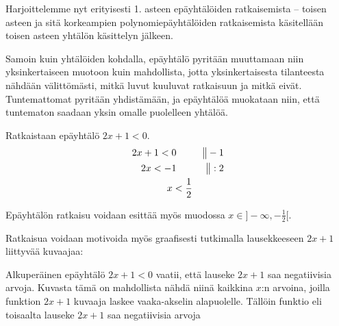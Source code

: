 Harjoittelemme nyt erityisesti 1. asteen epäyhtälöiden ratkaisemista -- toisen asteen ja sitä korkeampien polynomiepäyhtälöiden ratkaisemista käsitellään toisen asteen yhtälön käsittelyn jälkeen.

Samoin kuin yhtälöiden kohdalla, epäyhtälö pyritään muuttamaan niin yksinkertaiseen muotoon kuin mahdollista, jotta yksinkertaisesta tilanteesta nähdään välittömästi, mitkä luvut kuuluvat ratkaisuun ja mitkä eivät. Tuntemattomat pyritään yhdistämään, ja epäyhtälöä muokataan niin, että tuntematon saadaan yksin omalle puolelleen yhtälöä.


\begin{esimerkki}
Ratkaistaan epäyhtälö $2x+1<0$.
\begin{align*}
2x+1<0 \ \ \ \ \ &&\big\| -1 \\
2x<-1 \ \ \ \ \ &&\big\| :2 \\
x<\-\frac{1}{2}
\end{align*}

Epäyhtälön ratkaisu voidaan esittää myös muodossa $x \in ]-\infty, -\frac{1}{2}[$.

Ratkaisua voidaan motivoida myös graafisesti tutkimalla lausekkeeseen $2x+1$ liittyvää kuvaajaa:

\begin{kuvaajapohja}{1}{-2}{2}{-2}{2}
\end{kuvaajapohja}

Alkuperäinen epäyhtälö $2x+1<0$ vaatii, että lauseke $2x+1$ saa negatiivisia arvoja. Kuvasta tämä on mahdollista nähdä niinä kaikkina $x$:n arvoina, joilla funktion $2x+1$ kuvaaja laskee vaaka-akselin alapuolelle. Tällöin funktio eli toisaalta lauseke $2x+1$ saa negatiivisia arvoja

\end{esimerkki}

